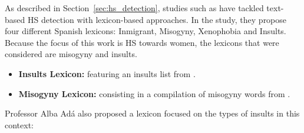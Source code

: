 
As described in Section~\ref{sec:hs_detection}, studies such as \cite{plazaDelArco-2020} have tackled text-based HS detection with lexicon-based approaches. In the study, they propose four different Spanish lexicons: Inmigrant, Misogyny, Xenophobia and Insults. Because the focus of this work is HS towards women, the lexicons that were considered are misogyny and insults. 
\begin{itemize}
    \item \textbf{Insults Lexicon:} featuring an insults list from \cite{plazaDelArco-2020}.
    \item \textbf{Misogyny Lexicon:} consisting in a compilation of misogyny words from \cite{plazaDelArco-2020}.
\end{itemize}

Professor Alba Adá also proposed a lexicon focused on the types of insults in this context:

